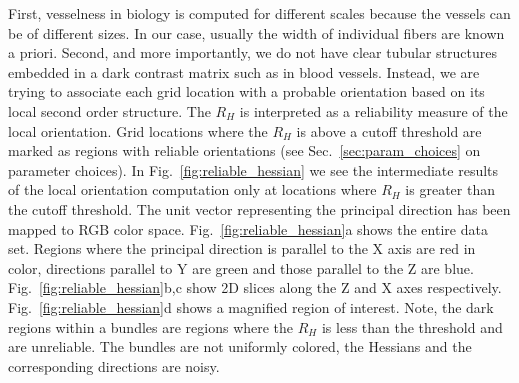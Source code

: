 First, vesselness in biology is computed for different scales because the vessels can be of different sizes. In our case, usually the width of individual fibers are known a priori.
Second, and more importantly, we do not have clear tubular structures embedded in a dark contrast matrix such as in blood vessels.
Instead, we are trying to associate each grid location  with a probable orientation based on its local second order structure. The $R_{H}$ is interpreted as a reliability measure of the local orientation.
Grid locations where the $R_{H}$ is above a cutoff threshold are marked as regions with reliable orientations (see Sec.~\ref{sec:param_choices} on parameter choices).
In Fig.~\ref{fig:reliable_hessian} we see the intermediate results of the local orientation computation only at locations where $R_{H}$ is greater than the cutoff threshold. The unit vector representing the principal direction has been mapped to RGB color space. Fig.~\ref{fig:reliable_hessian}a shows the entire data set. Regions where the principal direction is parallel to the X axis are red in color, directions parallel to Y are green and those parallel to the Z are blue. Fig.~\ref{fig:reliable_hessian}b,c show 2D slices along the Z and X axes respectively. Fig.~\ref{fig:reliable_hessian}d shows a magnified region of interest. Note, the dark regions within a bundles are regions where the $R_H$ is less than the threshold and are unreliable. The bundles are not uniformly colored, the Hessians and the corresponding directions are noisy.

